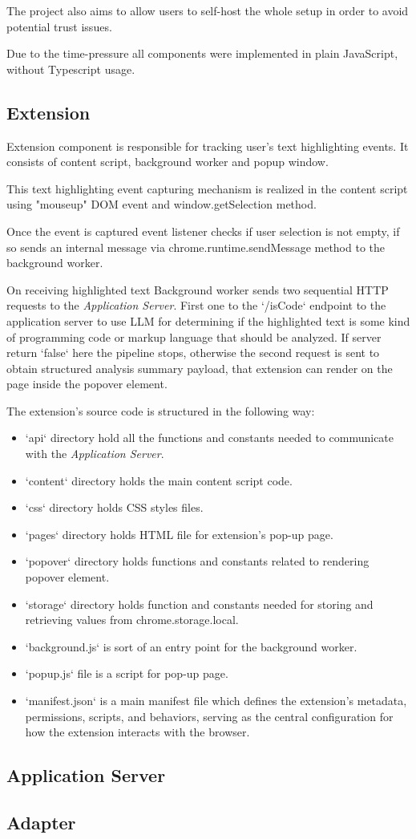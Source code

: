 The project also aims to allow users to self-host the whole setup in order to avoid
potential trust issues.

Due to the time-pressure all components were implemented in plain JavaScript,
without Typescript usage.

\subsection{Extension}

Extension component is responsible for tracking user's text highlighting events.
It consists of content script, background worker and popup window.

This text highlighting event capturing mechanism is realized in the content script
using "mouseup" DOM \autocite{DOM} event and window.getSelection method.

Once the event is captured event listener checks if user selection is not empty, if
so sends an internal message via chrome.runtime.sendMessage method to the background 
worker.

On receiving highlighted text Background worker sends two sequential HTTP
\autocite{HTTP} requests to the \emph{Application Server}. First one to the
`/isCode` endpoint to the application server to use LLM for determining if the
highlighted text is some kind of programming code or markup language that should be
analyzed. If server return `false` here the pipeline stops, otherwise the second
request is sent to obtain structured analysis summary payload, that extension
can render on the page inside the popover element.

The extension's source code is structured in the following way:
\begin{itemize}
    \item `api` directory hold all the functions and constants needed to
        communicate with the \emph{Application Server}.
    \item `content` directory holds the main content script code.
    \item `css` directory holds CSS styles files.
    \item `pages` directory holds HTML file for extension's pop-up page.
    \item `popover` directory holds functions and constants related to rendering
        popover element.
    \item `storage` directory holds function and constants needed for storing and
        retrieving values from chrome.storage.local.

    \item `background.js` is sort of an entry point for the background worker.
    \item `popup.js` file is a script for pop-up page.
    \item `manifest.json` is a main manifest file which defines the extension's
        metadata, permissions, scripts, and behaviors, serving as the central
        configuration for how the extension interacts with the browser.
\end{itemize}

\subsection{Application Server}

\subsection{Adapter}

